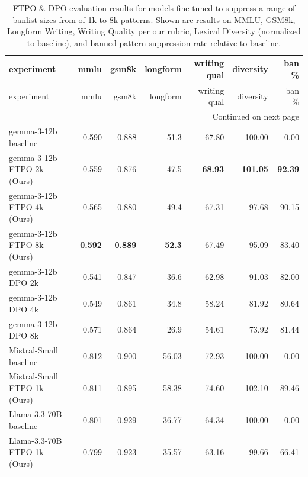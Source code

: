 \documentclass[11pt]{article}
\begin{document}
{%
\setlength{\tabcolsep}{4pt} %
\begin{longtable}{lrrrrrr}
\caption{FTPO \& DPO evaluation results for models fine-tuned to suppress a range of banlist sizes from of 1k to 8k patterns. Shown are results on MMLU, GSM8k, Longform Writing, Writing Quality per our rubric, Lexical Diversity (normalized to baseline), and banned pattern suppression rate relative to baseline.\label{tab:antislop-ftpo-eval-results}}\\
\toprule
experiment & mmlu & gsm8k & longform & writing qual & diversity & ban \% \\
\midrule
\endfirsthead

\toprule
experiment & mmlu & gsm8k & longform & writing qual & diversity & ban \% \\
\midrule
\endhead

\midrule
\multicolumn{7}{r}{Continued on next page} \\
\midrule
\endfoot

\bottomrule
\endlastfoot

\rowcolor{rowgray} gemma-3-12b baseline   & 0.590 & 0.888 & 51.3 & 67.80 & 100.00 & 0.00 \\
\rowcolor{rowgray} gemma-3-12b FTPO 2k (Ours)    & 0.559 & 0.876 & 47.5 & \textbf{68.93} & \textbf{101.05} & \textbf{92.39} \\
\rowcolor{rowgray} gemma-3-12b FTPO 4k (Ours)    & 0.565 & 0.880 & 49.4 & 67.31 & 97.68  & 90.15 \\
\rowcolor{rowgray} gemma-3-12b FTPO 8k (Ours)    & \textbf{0.592} & \textbf{0.889} & \textbf{52.3} & 67.49 & 95.09  & 83.40 \\
\rowcolor{rowgray} gemma-3-12b DPO 2k     & 0.541 & 0.847 & 36.6 & 62.98 & 91.03  & 82.00 \\
\rowcolor{rowgray} gemma-3-12b DPO 4k     & 0.549 & 0.861 & 34.8 & 58.24 & 81.92  & 80.64 \\
\rowcolor{rowgray} gemma-3-12b DPO 8k     & 0.571 & 0.864 & 26.9 & 54.61 & 73.92  & 81.44 \\

Mistral-Small baseline & 0.812 & 0.900 & 56.03  & 72.93 & 100.00 & 0.00 \\
Mistral-Small FTPO 1k (Ours)  & 0.811 & 0.895 & 58.38  & 74.60 & 102.10 & 89.46 \\

Llama-3.3-70B baseline     & 0.801   & 0.929 & 36.77  & 64.34 & 100.00 & 0.00 \\
Llama-3.3-70B FTPO 1k (Ours)     & 0.799   & 0.923   & 35.57  & 63.16 & 99.66 & 66.41 \\
\end{longtable}\vspace{-4pt}
}%
\end{document}
